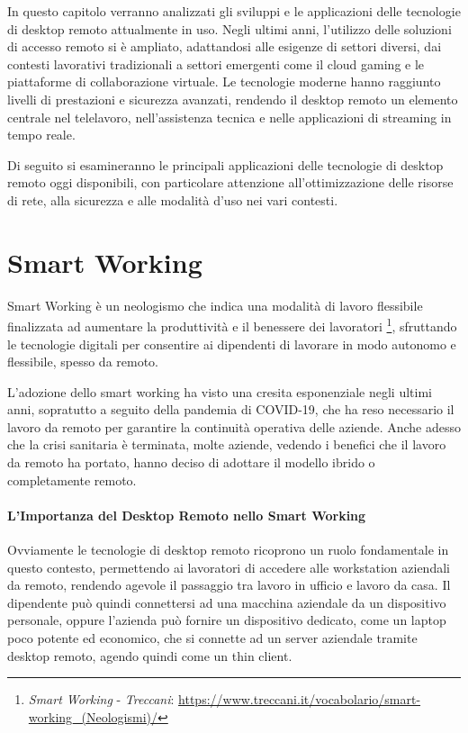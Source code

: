 \documentclass[12pt,a4paper,openright,twoside]{book}
\begin{document}
In questo capitolo verranno analizzati gli sviluppi e le applicazioni delle tecnologie di desktop remoto attualmente in uso. Negli ultimi anni, l'utilizzo delle soluzioni di accesso remoto si è ampliato, adattandosi alle esigenze di settori diversi, dai contesti lavorativi tradizionali a settori emergenti come il cloud gaming e le piattaforme di collaborazione virtuale. Le tecnologie moderne hanno raggiunto livelli di prestazioni e sicurezza avanzati, rendendo il desktop remoto un elemento centrale nel telelavoro, nell'assistenza tecnica e nelle applicazioni di streaming in tempo reale.

Di seguito si esamineranno le principali applicazioni delle tecnologie di desktop remoto oggi disponibili, con particolare attenzione all’ottimizzazione delle risorse di rete, alla sicurezza e alle modalità d'uso nei vari contesti.

\section{Smart Working}

Smart Working è un neologismo che indica una modalità di lavoro flessibile finalizzata ad aumentare la produttività e il benessere dei lavoratori \footnote{\emph{Smart Working} - \emph{Treccani}: \url{https://www.treccani.it/vocabolario/smart-working_(Neologismi)/}}, sfruttando le tecnologie digitali per consentire ai dipendenti di lavorare in modo autonomo e flessibile, spesso da remoto.

L'adozione dello smart working ha visto una cresita esponenziale negli ultimi anni, sopratutto a seguito della pandemia di COVID-19, che ha reso necessario il lavoro da remoto per garantire la continuità operativa delle aziende. Anche adesso che la crisi sanitaria è terminata, molte aziende, vedendo i benefici che il lavoro da remoto ha portato, hanno deciso di adottare il modello ibrido o completamente remoto.

\paragraph{L'Importanza del Desktop Remoto nello Smart Working}
Ovviamente le tecnologie di desktop remoto ricoprono un ruolo fondamentale in questo contesto, permettendo ai lavoratori di accedere alle workstation aziendali da remoto, rendendo agevole il passaggio tra lavoro in ufficio e lavoro da casa. Il dipendente può quindi connettersi ad una macchina aziendale da un dispositivo personale, oppure l'azienda può fornire un dispositivo dedicato, come un laptop poco potente ed economico, che si connette ad un server aziendale tramite desktop remoto, agendo quindi come un thin client.
\end{document}
